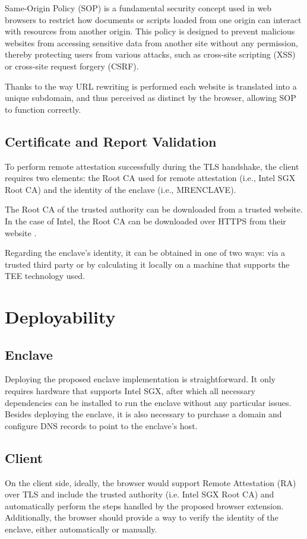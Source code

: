 Same-Origin Policy (SOP) \cite{rfc6454} is a fundamental security concept used in web browsers to restrict how documents or scripts loaded from one origin can interact with resources from another origin. This policy is designed to prevent malicious websites from accessing sensitive data from another site without any permission, thereby protecting users from various attacks, such as cross-site scripting (XSS) or cross-site request forgery (CSRF).

Thanks to the way URL rewriting is performed each website is translated into a unique subdomain, and thus perceived as distinct by the browser, allowing SOP to function correctly.

\subsection{Certificate and Report Validation}
To perform remote attestation successfully during the TLS handshake, the client requires two elements: the Root CA used for remote attestation (i.e., Intel SGX Root CA) and the identity of the enclave (i.e., MRENCLAVE).

The Root CA of the trusted authority can be downloaded from a trusted website. In the case of Intel, the Root CA can be downloaded over HTTPS from their website \cite{intelSGXattesationservice}. 

Regarding the enclave's identity, it can be obtained in one of two ways: via a trusted third party or by calculating it locally on a machine that supports the TEE technology used.

\section{Deployability}
\subsection{Enclave}
Deploying the proposed enclave implementation is straightforward. It only requires hardware that supports Intel SGX, after which all necessary dependencies can be installed to run the enclave without any particular issues. Besides deploying the enclave, it is also necessary to purchase a domain and configure DNS records to point to the enclave's host.

\subsection{Client}
On the client side, ideally, the browser would support Remote Attestation (RA) over TLS and include the trusted authority (i.e. Intel SGX Root CA) and automatically perform the steps handled by the proposed browser extension. Additionally, the browser should provide a way to verify the identity of the enclave, either automatically or manually.

